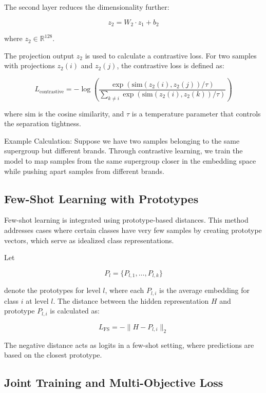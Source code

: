 \documentclass[9pt,a4paper,twoside]{rho-class/rho}
\begin{document}
The second layer reduces the dimensionality further:

\[ \label{eq:second_layer}
z_2 = W_2 \cdot z_1 + b_2
\]

where \( z_2 \in \mathbb{R}^{128} \). 

The projection output \( z_2 \) is used to calculate a contrastive loss. For two samples with projections \( z_2(i) \) and \( z_2(j) \), the contrastive loss is defined as:

\[ \label{eq:contrastive_loss}
L_{\text{contrastive}} = -\log\left(\frac{\exp\left(\text{sim}(z_2(i), z_2(j)) / \tau\right)}{\sum_{k \neq i} \exp\left(\text{sim}(z_2(i), z_2(k)) / \tau\right)}\right)
\]

where \( \text{sim} \) is the cosine similarity, and \( \tau \) is a temperature parameter that controls the separation tightness.

Example Calculation: Suppose we have two samples belonging to the same supergroup but different brands. Through contrastive learning, we train the model to map samples from the same supergroup closer in the embedding space while pushing apart samples from different brands.

    \subsection{Few-Shot Learning with Prototypes}

Few-shot learning is integrated using prototype-based distances. This method addresses cases where certain classes have very few samples by creating prototype vectors, which serve as idealized class representations.

Let 

\[
P_l = \{ P_{l,1}, \ldots, P_{l,k} \}
\]

denote the prototypes for level \( l \), where each \( P_{l,i} \) is the average embedding for class \( i \) at level \( l \). The distance between the hidden representation \( H \) and prototype \( P_{l,i} \) is calculated as:

\[ \label{eq:distance_prototype}
L_{\text{FS}} = -\| H - P_{l,i} \|_2
\]

The negative distance acts as logits in a few-shot setting, where predictions are based on the closest prototype.
        
    \subsection{Joint Training and Multi-Objective Loss}
\end{document}
